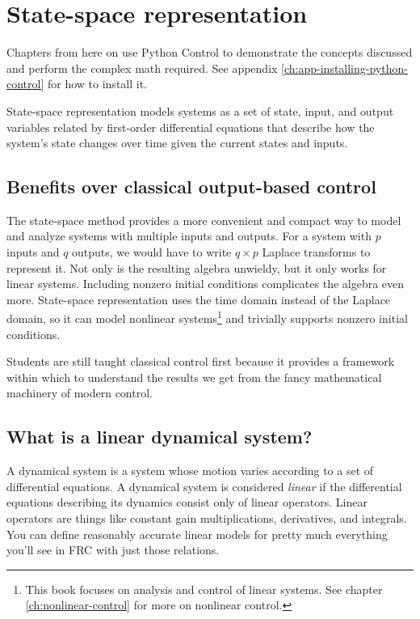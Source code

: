 
\chapter{State-space representation}

\begin{remark}
  Chapters from here on use Python Control to demonstrate the concepts discussed
  and perform the complex math required. See appendix
  \ref{ch:app-installing-python-control} for how to install it.
\end{remark}

State-space representation models \glspl{system} as a set of \gls{state},
\gls{input}, and \gls{output} variables related by first-order differential
equations that describe how the \gls{system}'s \gls{state} changes over time
given the current \glspl{state} and \glspl{input}.

\section{Benefits over classical output-based control}

The state-space method provides a more convenient and compact way to model and
analyze \glspl{system} with multiple \glspl{input} and \glspl{output}. For a
\gls{system} with $p$ \glspl{input} and $q$ \glspl{output}, we would have to
write $q \times p$ Laplace transforms to represent it. Not only is the resulting
algebra unwieldy, but it only works for linear \glspl{system}. Including nonzero
initial conditions complicates the algebra even more. State-space representation
uses the time domain instead of the Laplace domain, so it can model nonlinear
\glspl{system}\footnote{This book focuses on analysis and control of linear
\glspl{system}. See chapter \ref{ch:nonlinear-control} for more on nonlinear
control.} and trivially supports nonzero initial conditions.

Students are still taught classical control first because it provides a
framework within which to understand the results we get from the fancy
mathematical machinery of modern control.

\section{What is a linear dynamical system?}

A dynamical system is a \gls{system} whose motion varies according to a set of
differential equations. A dynamical system is considered \textit{linear} if the
differential equations describing its dynamics consist only of linear operators.
Linear operators are things like constant gain multiplications, derivatives, and
integrals. You can define reasonably accurate linear \glspl{model} for pretty
much everything you'll see in FRC with just those relations.

